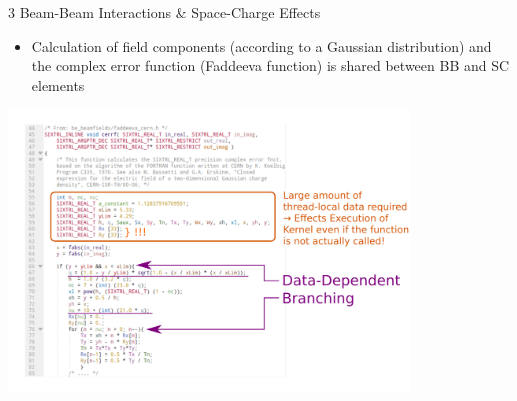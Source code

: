 \documentclass{beamer}
\begin{document}
\begin{frame}{3 Beam-Beam Interactions \& Space-Charge Effects}
\begin{itemize}
    \item Calculation of field components (according to a Gaussian distribution) and the complex error function (Faddeeva function) is shared between BB and SC elements
\end{itemize}
\includegraphics[width=0.8\textwidth]{beam_fields_figs/fadeeva_03.png}
\end{frame}
\end{document}
